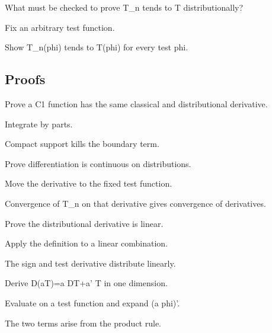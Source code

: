 \begin{exercise}\label{exr:iii16-expand-05}
What must be checked to prove T\_n tends to T distributionally?
\end{exercise}
\begin{hint}
Fix an arbitrary test function.
\end{hint}
\begin{solution}
Show T\_n(phi) tends to T(phi) for every test phi.
\end{solution}

\subsection*{Proofs}

\begin{exercise}\label{exr:iii16-expand-06}
Prove a C1 function has the same classical and distributional derivative.
\end{exercise}
\begin{hint}
Integrate by parts.
\end{hint}
\begin{solution}
Compact support kills the boundary term.
\end{solution}

\begin{exercise}\label{exr:iii16-expand-07}
Prove differentiation is continuous on distributions.
\end{exercise}
\begin{hint}
Move the derivative to the fixed test function.
\end{hint}
\begin{solution}
Convergence of T\_n on that derivative gives convergence of derivatives.
\end{solution}

\begin{exercise}[Linearity]\label{exr:iii16-expand-08}
Prove the distributional derivative is linear.
\end{exercise}
\begin{hint}
Apply the definition to a linear combination.
\end{hint}
\begin{solution}
The sign and test derivative distribute linearly.
\end{solution}

\begin{exercise}\label{exr:iii16-expand-09}
Derive D(aT)=a DT+a' T in one dimension.
\end{exercise}
\begin{hint}
Evaluate on a test function and expand (a phi)'.
\end{hint}
\begin{solution}
The two terms arise from the product rule.
\end{solution}


